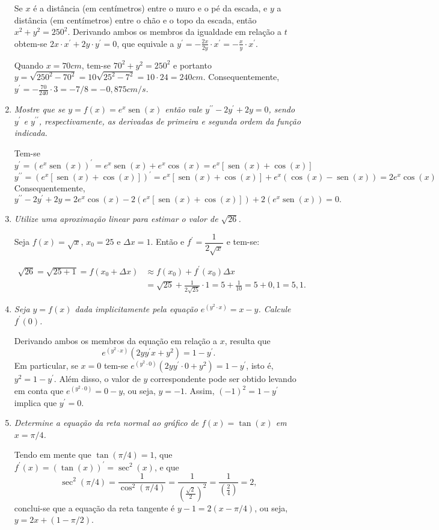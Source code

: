 \documentclass[12pt,a4paper]{article}
\newcommand*\sen{\operatorname{sen}}
\begin{document}
\begin{enumerate}
Se $x$ é a distância (em centímetros) entre o muro e o pé da escada, e $y$ a distância (em centímetros) entre o chão e o topo da escada, então $x^2+y^2=250^2$. Derivando ambos os membros da igualdade em relação a $t$ obtem-se $2x \cdot x^\prime + 2y \cdot y^\prime = 0$, que equivale a $y^\prime = -\frac{2x}{2y} \cdot x^\prime = -\frac{x}{y} \cdot x^\prime$.

Quando $x = 70cm$, tem-se $70^2+y^2=250^2$ e portanto $y=\sqrt{ 250^2 - 70^2 } = 10 \sqrt{ 25^2 - 7^2} = 10 \cdot 24 = 240 cm$. Consequentemente, $y^\prime = -\frac{70}{240} \cdot 3 = -7/8 = -0,875 cm/s$.

\item \textit{ Mostre que se
$y = f(x) = e^x \sen(x)$
então vale
$y^{\prime \prime} - 2y^\prime +2y = 0$,
sendo $y^\prime$ e $y^{\prime\prime}$, respectivamente, as derivadas de primeira e segunda ordem da função indicada. }

Tem-se
\[
y^\prime
= (e^x \sen(x))^\prime
= e^x \sen(x) + e^x \cos(x)
= e^x \left[ \sen(x) + \cos(x) \right]
\]
\[
y^{\prime\prime}
= (e^x \left[ \sen(x) + \cos(x) \right] )^\prime
= e^x\left[ \sen(x) + \cos(x) \right] + e^x ( \cos(x) - \sen(x) )
= 2 e^x \cos(x)
\]
Consequentemente,
\[
y^{\prime \prime} - 2y^\prime +2y
= 2 e^x \cos(x)
- 2 \left( e^x \left[ \sen(x) + \cos(x) \right] \right)
+ 2 \left( e^x \sen(x) \right)
= 0.
\]

\item \textit{ Utilize uma aproximação linear para estimar o valor de $\sqrt{26}$. }


Seja $f(x) = \sqrt{x}$, $x_0 = 25$ e $\Delta x = 1$. Então e $f^\prime = \dfrac{1}{2\sqrt{x}}$ e tem-se:

\begin{align*}
\sqrt{26} = \sqrt{25 + 1}
= f(x_0+\Delta x)
& \approx f(x_0) + f^{\prime}(x_0)\Delta x \\
& = \sqrt{25} + \frac{1}{2\sqrt{25}} \cdot 1
= 5 + \frac{1}{10}
= 5 + 0,1
= 5,1.
\end{align*}


\item \textit{ Seja $y=f(x)$ dada implicitamente pela equação $e^{(y^2 \cdot x)}=x-y$. Calcule $f^\prime(0)$. }

Derivando ambos os membros da equação em relação a $x$, resulta que
\[
e^{(y^2 \cdot x)}(2y y^\prime x + y^2)=1-y^\prime.
\]
Em particular, se $x=0$ tem-se $e^{(y^2 \cdot 0)}(2y y^\prime \cdot 0 + y^2)=1-y^\prime$, isto é, $y^2=1-y^\prime$. Além disso, o valor de $y$ correspondente pode ser obtido levando em conta que $e^{(y^2 \cdot 0)}=0-y$, ou seja, $y=-1$. Assim, $(-1)^2=1-y^\prime$ implica que $y^\prime = 0$.

\item \textit{ Determine a equação da reta normal ao gráfico de $f(x) = \tan(x)$ em $x=\pi/4$. }

Tendo em mente que $\tan(\pi/4) = 1$, que $f^\prime(x) = (\tan(x))^\prime = \sec^2(x)$, e que
\[
\sec^2(\pi/4)
= \frac{1}{\cos^2(\pi/4)}
= \frac{1}{ \left(\frac{ \sqrt{2} }{2}\right)^2 }
= \frac{1}{ \left(\frac{ 2 }{4}\right) }
= 2,
\]
conclui-se que a equação da reta tangente é $y - 1 = 2(x-\pi/4)$, ou seja, $y = 2x + (1-\pi/2)$.
\end{enumerate}
\end{document}

